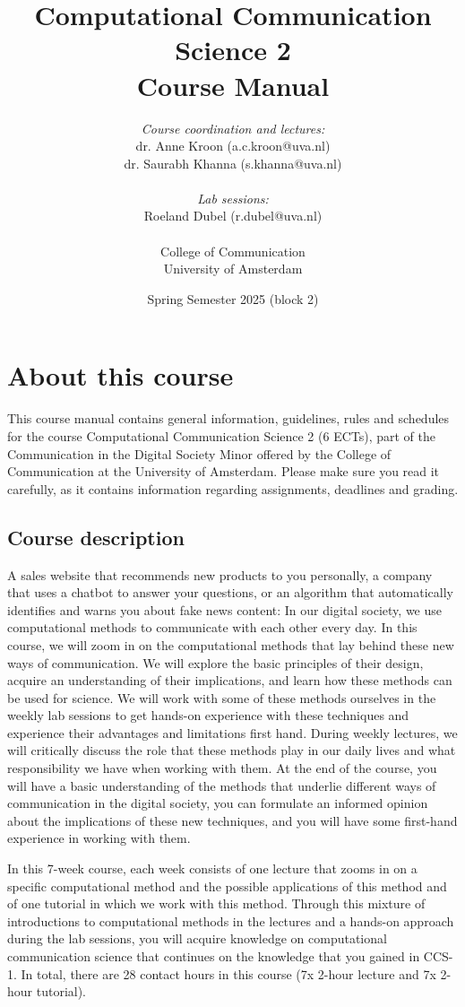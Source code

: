 \documentclass[a4paper,10pt]{report}
\title{Computational Communication Science 2\\ Course Manual}
\author{\emph{Course coordination and lectures:}\\ dr. Anne Kroon (a.c.kroon@uva.nl)\\dr. Saurabh Khanna (s.khanna@uva.nl) \\ \\ \emph{Lab sessions:}  \\ Roeland Dubel (r.dubel@uva.nl)\\~\\College of Communication\\University of Amsterdam}
\date{Spring Semester 2025 (block 2)}
\begin{document}
	\maketitle
	
	\tableofcontents

	
	\chapter{About this course}
	
	This course manual contains general information, guidelines, rules and schedules for the course Computational Communication Science 2 (6 ECTs), part of the Communication in the Digital Society Minor offered by the College of Communication at the University of Amsterdam. Please make sure you read it carefully, as it  contains information regarding assignments, deadlines and grading.
	
	\section{Course description}
	
	A sales website that recommends new products to you personally, a company that uses a chatbot to answer your questions, or an algorithm that automatically identifies and warns you about fake news content: In our digital society, we use computational methods to communicate with each other every day. In this course, we will zoom in on the computational methods that lay behind these new ways of communication. We will explore the basic principles of their design, acquire an understanding of their implications, and learn how these methods can be used for science. We will work with some of these methods ourselves in the weekly lab sessions to get hands-on experience with these techniques and experience their advantages and limitations first hand. During weekly lectures, we will critically discuss the role that these methods play in our daily lives and what responsibility we have when working with them. At the end of the course, you will have a basic understanding of the methods that underlie different ways of communication in the digital society, you can formulate an informed opinion about the implications of these new techniques, and you will have some first-hand experience in working with them.
	
	In this 7-week course, each week consists of one lecture that zooms in on a specific computational method and the possible applications of this method and of one tutorial in which we work with this method. Through this mixture of introductions to computational methods in the lectures and a hands-on approach during the lab sessions, you will acquire knowledge on computational communication science that continues on the knowledge that you gained in CCS-1. In total, there are 28 contact hours in this course (7x 2-hour lecture and 7x 2-hour tutorial). 
	
\end{document}
